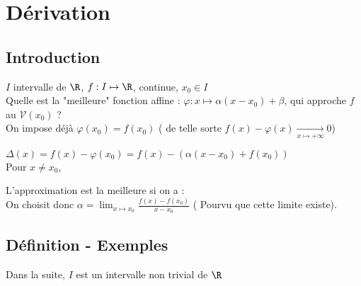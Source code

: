 \documentclass[12pt,a4paper]{report}
\begin{document}
\chapter{Dérivation}

\section*{Introduction}

$I$ intervalle de $\R$, $f:I \mapsto \R$, continue, $x_0 \in I$\\
Quelle est la "meilleure" fonction affine : $\varphi : x \mapsto \alpha(x-x_0)+\beta$, qui approche $f$ au $\mathcal{V}(x_0)$ ?\\

On impose déjà $\varphi(x_0) = f(x_0)$ ( de telle sorte $f(x)-\varphi (x) \xrightarrow[x \mapsto +\infty]{} 0$)
\begin{center}
    \ie {}
\end{center} 
$\Delta (x) = f(x) - \varphi (x_0) = f(x) - (\alpha (x-x_0)+f(x_0))$\\
Pour $x\neq x_0$, 
\begin{center}
\end{center}
L'approximation est la meilleure si on a : \\

On choisit donc $\alpha = \displaystyle\lim_{x \mapsto x_0} \frac{f(x)-f(x_0)}{x-x_0}$ ( Pourvu que cette limite existe).

\section{Définition - Exemples}
Dans la suite, $I$ est un intervalle non trivial de $\R$
\end{document}
